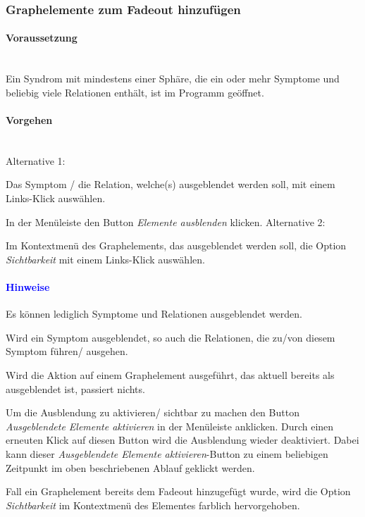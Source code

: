 \documentclass[enabledeprecatedfontcommands,fontsize=11pt,paper=a4,twoside]{scrartcl}
\newcounter{one}
\newcounter{two}[one]
\newcommand*{\hint}{\paragraph{\textcolor{blue}{Hinweise}}}
\newcommand*{\condition}{\paragraph{Voraussetzung}$\;$ \vspace{0.2cm}\\}
\newcommand*{\actions}{\paragraph{Vorgehen} $\;$\vspace{0.2cm}\\}
\newcommand*{\aOne}{\textcolor{bbe}{Alternative 1:}}
\newcommand*{\aTwo}{\textcolor{bbe}{Alternative 2:}}
\let\tempone\itemize
\let\temptwo\enditemize
\renewenvironment{itemize}{\tempone\addtolength{\itemsep}{-10.0pt}}{\temptwo}
\let\origenumerate\enumerate
\let\origendenumerate\endenumerate
\renewenvironment{enumerate}{\origenumerate \addtolength{\itemsep}{-10.0pt}}{\origendenumerate}
\begin{document}
\subsubsection{Graphelemente zum Fadeout hinzufügen}
	\condition 	
		Ein Syndrom mit mindestens einer Sphäre, die ein oder mehr Symptome und beliebig viele Relationen enthält, ist im Programm geöffnet. 
		\actions
		\aOne
		\begin{enumerate}
			\item Das Symptom / die Relation, welche(s) ausgeblendet werden soll, mit einem Links-Klick auswählen. 
			\item In der Menüleiste den Button \textit{Elemente ausblenden} klicken.
		\end{enumerate}
		\aTwo
		\begin{enumerate}
			\item Im Kontextmenü des Graphelements, das ausgeblendet werden soll, die Option \textit{Sichtbarkeit} mit einem Links-Klick auswählen.
		\end{enumerate}
		\hint
		\begin{itemize}
					\item Es können lediglich Symptome und Relationen ausgeblendet werden. 
					\item Wird ein Symptom ausgeblendet, so auch die Relationen, die zu/von diesem Symptom führen/ ausgehen.
					\item Wird die Aktion auf einem Graphelement ausgeführt, das aktuell bereits als ausgeblendet ist, passiert nichts.
					\item Um die Ausblendung zu aktivieren/ sichtbar zu machen den Button \textit{Ausgeblendete Elemente aktivieren} in der Menüleiste anklicken. Durch einen erneuten Klick auf diesen Button wird die Ausblendung wieder deaktiviert. Dabei kann dieser \textit{Ausgeblendete Elemente aktivieren}-Button zu einem beliebigen Zeitpunkt im oben beschriebenen Ablauf geklickt werden.
					\item Fall ein Graphelement bereits dem Fadeout hinzugefügt wurde, wird die Option \textit{Sichtbarkeit} im Kontextmenü des Elementes farblich hervorgehoben. \\
		\end{itemize}
		
\end{document}
